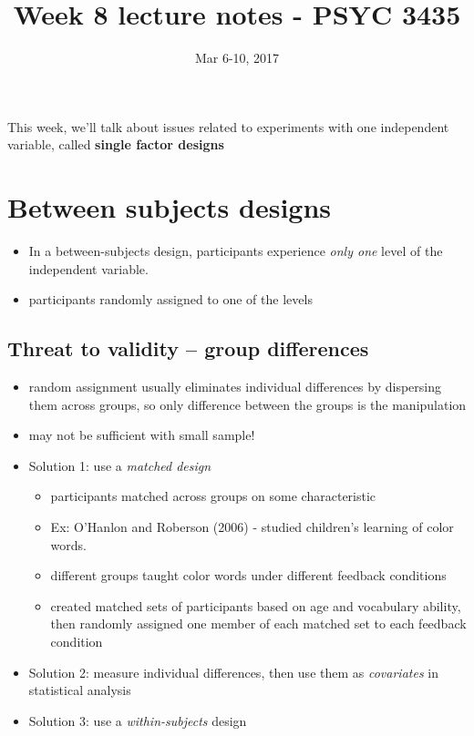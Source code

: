 \documentclass[11pt]{article}
\date{Mar 6-10, 2017}
\title{Week 8 lecture notes - PSYC 3435}
\begin{document}
\maketitle
This week, we'll talk about issues related to experiments with one independent variable, called \textbf{single factor designs}

\section*{Between subjects designs}
\label{sec-1}
\begin{itemize}
\item In a between-subjects design, participants experience \emph{only one} level of the independent variable.
\item participants randomly assigned to one of the levels
\end{itemize}

\subsection*{Threat to validity -- group differences}
\label{sec-1-1}
\begin{itemize}
\item random assignment usually eliminates individual differences by dispersing them across groups, so only difference between the groups is the manipulation
\item may not be sufficient with small sample!
\item Solution 1: use a \emph{matched design}
\begin{itemize}
\item participants matched across groups on some characteristic
\item Ex: O'Hanlon and Roberson (2006) - studied children's learning of color words.
\item different groups taught color words under different feedback conditions
\item created matched sets of participants based on age and vocabulary ability, then randomly assigned one member of each matched set to each feedback condition
\end{itemize}
\item Solution 2: measure individual differences, then use them as \emph{covariates} in statistical analysis
\item Solution 3: use a \emph{within-subjects} design
\end{itemize}
\end{document}

